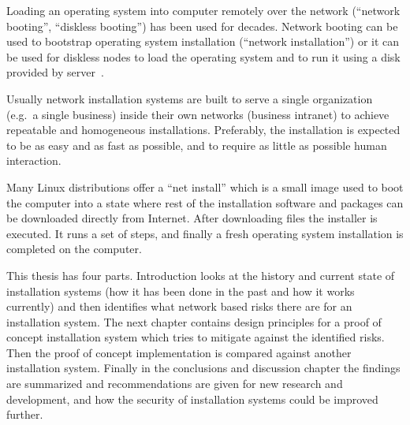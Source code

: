 
\iffalse
\begin{itemize}
\item FIXME: TODO REMOVE THIS LIST
\item INTRODUCTION: The Setting - bird eye's view - the challenge to be tackled / thing to be be improved in general
\item INTRODUCTION: Past research done
\item INTRODUCTION: Gap in knowledge/problem not yet solved
\item INTRODUCTION: Purpose and method of this work
\item INTRODUCTION: More detailed description what was done
\item INTRODUCTION: Results acquired
\item INTRODUCTION: Analysis and limitations of the result (Mostly relocate to Conclusions)
\item INTRODUCTION: Value (Mostly relocate to Conclusions)
\end{itemize}
\fi

Loading an operating system into computer remotely over the network
(``network booting'', ``diskless booting'') has been used for
decades. Network booting can be used to bootstrap operating system
installation (``network installation'') or it can be used for diskless
nodes to load the operating system and to run it using a disk provided
by server~\cite{anvin2008x86}.

Usually network installation systems are built to serve a single
organization (e.g.\ a single business) inside their own networks
(business intranet) to achieve repeatable and homogeneous
installations. Preferably, the installation is expected to be as easy
and as fast as possible, and to require as little as possible human
interaction.

Many Linux distributions offer a ``net install'' which is a small
image used to boot the computer into a state where rest of the
installation software and packages can be downloaded directly from
Internet. After downloading files the installer is executed. It runs a
set of steps, and finally a fresh operating system installation is
completed on the computer.

This thesis has four parts. Introduction looks at the history and
current state of installation systems (how it has been done in the
past and how it works currently) and then identifies what network
based risks there are for an installation system. The next chapter
contains design principles for a proof of concept installation system
which tries to mitigate against the identified risks. Then the proof
of concept implementation is compared against another installation
system. Finally in the conclusions and discussion chapter the findings
are summarized and recommendations are given for new research and
development, and how the security of installation systems could be
improved further.

